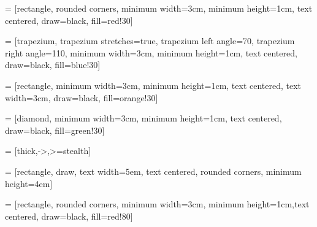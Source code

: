 \renewcommand{\labelitemi}{$\bullet$}
\renewcommand{\labelitemii}{$\cdot$}
\renewcommand{\labelitemiii}{$\diamond$}
\renewcommand{\labelitemiv}{$\ast$}
 = [rectangle, rounded corners, 
minimum width=3cm, 
minimum height=1cm,
text centered, 
draw=black, 
fill=red!30]

 = [trapezium, 
trapezium stretches=true, %
trapezium left angle=70, 
trapezium right angle=110, 
minimum width=3cm, 
minimum height=1cm, text centered, 
draw=black, fill=blue!30]

 = [rectangle, 
minimum width=3cm, 
minimum height=1cm, 
text centered, 
text width=3cm, 
draw=black, 
fill=orange!30]

 = [diamond, 
minimum width=3cm, 
minimum height=1cm, 
text centered, 
draw=black, 
fill=green!30]

 = [thick,->,>=stealth]

 = [rectangle, draw, text width=5em, text centered, rounded corners, minimum height=4em]

 = [rectangle, rounded corners, minimum width=3cm, minimum height=1cm,text centered, draw=black, fill=red!80]


